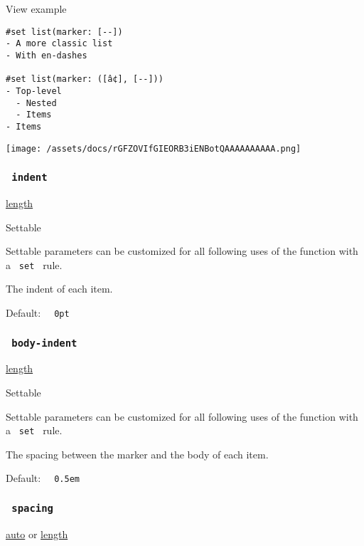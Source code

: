 
View example

\begin{verbatim}
#set list(marker: [--])
- A more classic list
- With en-dashes

#set list(marker: ([â¢], [--]))
- Top-level
  - Nested
  - Items
- Items
\end{verbatim}

\texttt{[image: /assets/docs/rGFZOVIfGIEORB3iENBotQAAAAAAAAAA.png]}

\subsubsection{\texorpdfstring{\texttt{\ indent\ }}{ indent }}\label{parameters-indent}

\href{/docs/reference/layout/length/}{length}

{{ Settable }}

\label{parameters-indent-settable-tooltip}
Settable parameters can be customized for all following uses of the
function with a \texttt{\ set\ } rule.

The indent of each item.

Default: \texttt{\ }{\texttt{\ 0pt\ }}\texttt{\ }

\subsubsection{\texorpdfstring{\texttt{\ body-indent\ }}{ body-indent }}\label{parameters-body-indent}

\href{/docs/reference/layout/length/}{length}

{{ Settable }}

\label{parameters-body-indent-settable-tooltip}
Settable parameters can be customized for all following uses of the
function with a \texttt{\ set\ } rule.

The spacing between the marker and the body of each item.

Default: \texttt{\ }{\texttt{\ 0.5em\ }}\texttt{\ }

\subsubsection{\texorpdfstring{\texttt{\ spacing\ }}{ spacing }}\label{parameters-spacing}

\href{/docs/reference/foundations/auto/}{auto} {or}
\href{/docs/reference/layout/length/}{length}

